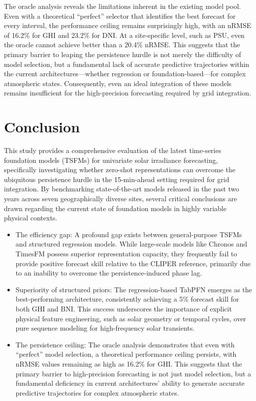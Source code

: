 \documentclass[number, 3p, 10pt, times]{elsarticle}
\begin{document}
The oracle analysis reveals the limitations inherent in the existing model pool. Even with a theoretical ``perfect'' selector that identifies the best forecast for every interval, the performance ceiling remains surprisingly high, with an nRMSE of 16.2\% for GHI and 23.2\% for DNI. At a site-specific level, such as PSU, even the oracle cannot achieve better than a 20.4\% nRMSE. This suggests that the primary barrier to leaping the persistence hurdle is not merely the difficulty of model selection, but a fundamental lack of accurate predictive trajectories within the current architectures---whether regression or foundation-based---for complex atmospheric states. Consequently, even an ideal integration of these models remains insufficient for the high-precision forecasting required by grid integration.

\section{Conclusion}
This study provides a comprehensive evaluation of the latest time-series foundation models (TSFMs) for univariate solar irradiance forecasting, specifically investigating whether zero-shot representations can overcome the ubiquitous persistence hurdle in the 15-min-ahead setting required for grid integration. By benchmarking state-of-the-art models released in the past two years across seven geographically diverse sites, several critical conclusions are drawn regarding the current state of foundation models in highly variable physical contexts.
\begin{itemize}
    \item The efficiency gap: A profound gap exists between general-purpose TSFMs and structured regression models. While large-scale models like Chronos and TimesFM possess superior representation capacity, they frequently fail to provide positive forecast skill relative to the CLIPER reference, primarily due to an inability to overcome the persistence-induced phase lag.
    \item Superiority of structured priors: The regression-based TabPFN emerges as the best-performing architecture, consistently achieving a 5\% forecast skill for both GHI and BNI. This success underscores the importance of explicit physical feature engineering, such as solar geometry or temporal cycles, over pure sequence modeling for high-frequency solar transients.
    \item The persistence ceiling: The oracle analysis demonstrates that even with ``perfect'' model selection, a theoretical performance ceiling persists, with nRMSE values remaining as high as 16.2\% for GHI. This suggests that the primary barrier to high-precision forecasting is not just model selection, but a fundamental deficiency in current architectures' ability to generate accurate predictive trajectories for complex atmospheric states.
\end{itemize}
\end{document}
